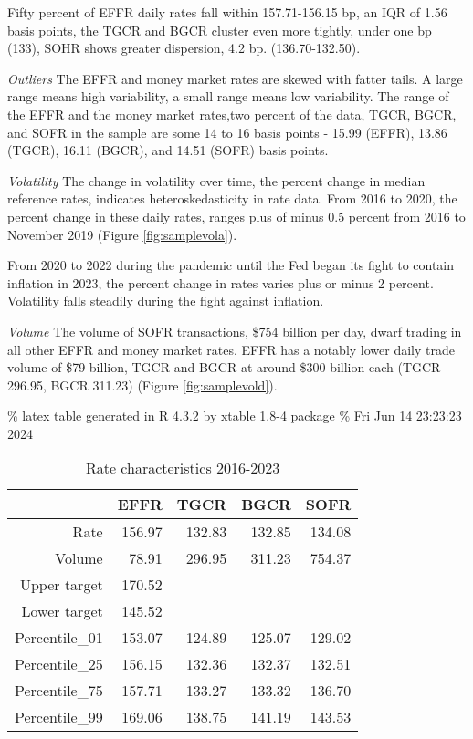\documentclass[
]{article}
\begin{document}
Fifty percent of EFFR daily rates fall within 157.71-156.15 bp, an IQR of 1.56 basis points, the TGCR and BGCR cluster even more tightly, under one bp (133), SOHR shows greater dispersion, 4.2 bp. (136.70-132.50).

\emph{Outliers}
The EFFR and money market rates are skewed with fatter tails. A large range means high variability, a small range means low variability. The range of the EFFR and the money market rates,two percent of the data, TGCR, BGCR, and SOFR in the sample are some 14 to 16 basis points - 15.99 (EFFR), 13.86 (TGCR), 16.11 (BGCR), and 14.51 (SOFR) basis points.

\emph{Volatility}
The change in volatility over time, the percent change in median reference rates, indicates heteroskedasticity in rate data. From 2016 to 2020, the percent change in these daily rates, ranges plus of minus 0.5 percent from 2016 to November 2019 (Figure \ref{fig:samplevola}).

From 2020 to 2022 during the pandemic until the Fed began its fight to contain inflation in 2023, the percent change in rates varies plus or minus 2 percent. Volatility falls steadily during the fight against inflation.

\emph{Volume}
The volume of SOFR transactions, \$754 billion per day, dwarf trading in all other EFFR and money market rates. EFFR has a notably lower daily trade volume of \$79 billion, TGCR and BGCR at around \$300 billion each (TGCR 296.95, BGCR 311.23) (Figure \ref{fig:samplevold}).

\% latex table generated in R 4.3.2 by xtable 1.8-4 package
\% Fri Jun 14 23:23:23 2024

\begin{table}[ht]
\centering
\begin{tabular}{rrrrr}
  \hline
 & EFFR & TGCR & BGCR & SOFR \\ 
  \hline
Rate & 156.97 & 132.83 & 132.85 & 134.08 \\ 
  Volume & 78.91 & 296.95 & 311.23 & 754.37 \\ 
  Upper target & 170.52 &  &  &  \\ 
  Lower target & 145.52 &  &  &  \\ 
  Percentile\_01 & 153.07 & 124.89 & 125.07 & 129.02 \\ 
  Percentile\_25 & 156.15 & 132.36 & 132.37 & 132.51 \\ 
  Percentile\_75 & 157.71 & 133.27 & 133.32 & 136.70 \\ 
  Percentile\_99 & 169.06 & 138.75 & 141.19 & 143.53 \\ 
   \hline
\end{tabular}
\caption{Rate characteristics 2016-2023} 
\label{tab:Rate characteristics 2016-2023}
\end{table}
\end{document}
